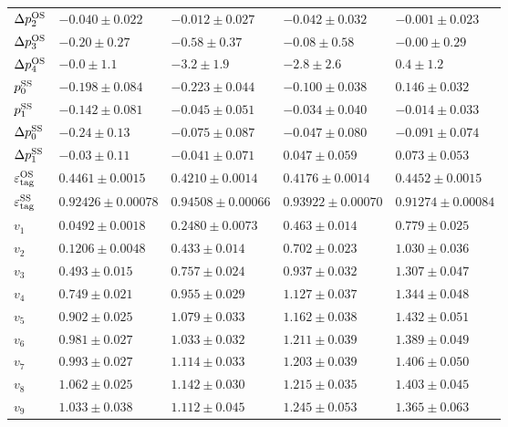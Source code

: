 \begin{table}
{\begin{tabular}{lllll}
    $\Delta p_{2}^{\rm OS}$       & $-0.040\pm0.022$   & $-0.012\pm0.027$    & $-0.042\pm0.032$    & $-0.001\pm0.023$    \\      
    $\Delta p_{3}^{\rm OS}$       & $-0.20\pm0.27$     & $-0.58\pm0.37$      & $-0.08\pm0.58$      & $-0.00\pm0.29$      \\      
    $\Delta p_{4}^{\rm OS}$       & $-0.0\pm1.1$       & $-3.2\pm1.9$        & $-2.8\pm2.6$        & $0.4\pm1.2$         \\ 
    \midrule
    $p_{0}^{\rm SS}$             & $-0.198\pm0.084$   & $-0.223\pm0.044$    & $-0.100\pm0.038$    & $0.146\pm0.032$     \\      
    $p_{1}^{\rm SS}$             & $-0.142\pm0.081$   & $-0.045\pm0.051$    & $-0.034\pm0.040$    & $-0.014\pm0.033$    \\  
    $\Delta p_{0}^{\rm SS}$       & $-0.24\pm0.13$     & $-0.075\pm0.087$    & $-0.047\pm0.080$    & $-0.091\pm0.074$    \\     
    $\Delta p_{1}^{\rm SS}$       & $-0.03\pm0.11$     & $-0.041\pm0.071$    & $0.047\pm0.059$     & $0.073\pm0.053$     \\
    \midrule
    $\varepsilon_{\rm tag}^{\rm OS}$ & $0.4461\pm0.0015$  & $0.4210\pm0.0014$   & $0.4176\pm0.0014$   & $0.4452\pm0.0015$   \\      
    $\varepsilon_{\rm tag}^{\rm SS}$ & $0.92426\pm0.00078$& $0.94508\pm0.00066$ & $0.93922\pm0.00070$ & $0.91274\pm0.00084$ \\ 
    \midrule
    $v_{1}$               & $0.0492\pm0.0018$  & $0.2480\pm0.0073$   & $0.463\pm0.014$     & $0.779\pm0.025$     \\           
    $v_{2}$               & $0.1206\pm0.0048$  & $0.433\pm0.014$     & $0.702\pm0.023$     & $1.030\pm0.036$     \\       
    $v_{3}$               & $0.493\pm0.015$    & $0.757\pm0.024$     & $0.937\pm0.032$     & $1.307\pm0.047$     \\      
    $v_{4}$               & $0.749\pm0.021$    & $0.955\pm0.029$     & $1.127\pm0.037$     & $1.344\pm0.048$     \\      
    $v_{5}$               & $0.902\pm0.025$    & $1.079\pm0.033$     & $1.162\pm0.038$     & $1.432\pm0.051$     \\     
    $v_{6}$               & $0.981\pm0.027$    & $1.033\pm0.032$     & $1.211\pm0.039$     & $1.389\pm0.049$     \\      
    $v_{7}$               & $0.993\pm0.027$    & $1.114\pm0.033$     & $1.203\pm0.039$     & $1.406\pm0.050$     \\     
    $v_{8}$               & $1.062\pm0.025$    & $1.142\pm0.030$     & $1.215\pm0.035$     & $1.403\pm0.045$     \\      
    $v_{9}$               & $1.033\pm0.038$    & $1.112\pm0.045$     & $1.245\pm0.053$     & $1.365\pm0.063$     \\           
    \bottomrule
  \end{tabular}
  }
\end{table}

